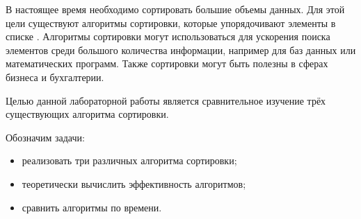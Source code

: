 \Introduction

В настоящее время необходимо сортировать большие объемы данных. Для этой цели существуют алгоритмы сортировки, которые упорядочивают элементы в списке \cite{knuth}. Алгоритмы сортировки могут использоваться для ускорения поиска элементов среди большого количества информации, например для баз данных или математических программ. Также сортировки могут быть полезны в сферах бизнеса и бухгалтерии.

Целью данной лабораторной работы является сравнительное изучение трёх существующих алгоритма сортировки.

Обозначим задачи:

\begin{itemize}
    \item реализовать три различных алгоритма сортировки;
    \item теоретически вычислить эффективность алгоритмов;
    \item сравнить алгоритмы по времени.
\end{itemize}


